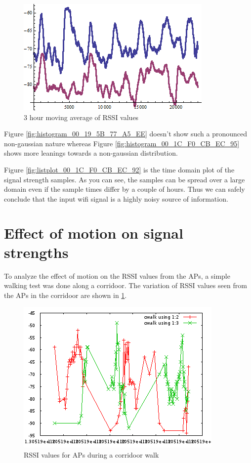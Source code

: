 \begin{figure}\centering
    \includegraphics{figures/moving_average.png}
    \caption{3 hour moving average of RSSI values}
\end{figure}

Figure \ref{fig:histogram_00_19_5B_77_A5_EE} doesn't show such a pronounced non-gaussian
nature whereas Figure \ref{fig:histogram_00_1C_F0_CB_EC_95} shows more leanings towards a
non-gaussian distribution.

Figure \ref{fig:listplot_00_1C_F0_CB_EC_92} is the time domain plot of the signal strength
samples. As you can see, the samples can be spread over a large domain even if the 
sample times differ by a couple of hours. Thus we can safely conclude that the 
input wifi signal is a highly noisy source of information.

\section{Effect of motion on signal strengths}

To analyze the effect of motion on the RSSI values from the APs, a simple walking
test was done along a corridoor. The variation of RSSI values seen from the APs in
the corridoor are shown in \ref{fig:wifi_corridoor_walk}.

\begin{figure}\centering
    \includegraphics{figures/wifi_corridoor_walk.png}
    \caption{RSSI values for APs during a corridoor walk \label{fig:wifi_corridoor_walk}}
\end{figure}

